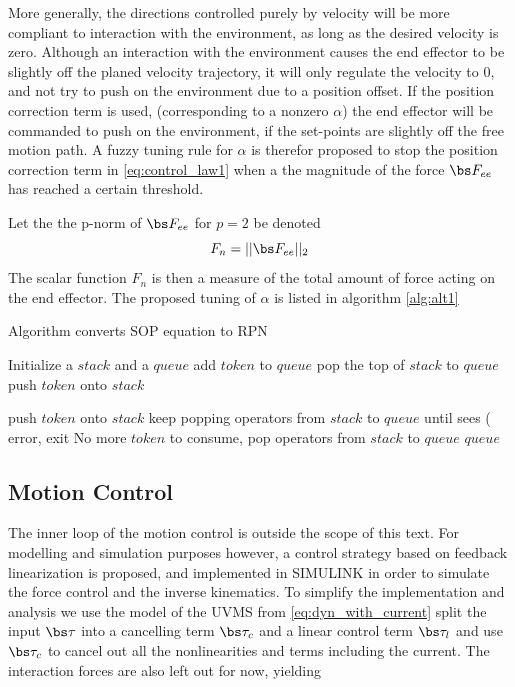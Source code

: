 More generally, the directions controlled purely by velocity will be more compliant to interaction with the environment, as long as the desired velocity is zero. Although an interaction with the environment causes the end effector to be slightly off the planed velocity trajectory, it will only regulate the velocity to 0, and not try to push on the environment due to a position offset. If the position correction term is used, (corresponding to a nonzero $\alpha$)
the end effector will be commanded to push on the environment, if the set-points are slightly off the free motion path. A fuzzy tuning rule for $\alpha$ is therefor proposed to stop the position correction term in \eqref{eq:control_law1} when a the magnitude of the force $\bs F_{ee}$ has reached a certain threshold. 


Let the the p-norm of $\bs F_{ee}$ for $p=2$ be denoted $$F_n=||\bs F_{ee}||_{2}$$ The scalar function $F_{n}$ is then a measure of the total amount of force acting on the end effector. The proposed tuning of $\alpha$ is listed in algorithm \ref{alg:alt1} 

\begin{algorithm}
	\caption{Algorithm converts SOP equation to RPN \label{alg:alt1}}
\begin{algorithmic}[1]
\REQUIRE Initialize a $stack$ and a $queue$
        \STATE add $token$ to $queue$
            \STATE pop the top of $stack$ to $queue$
        \ENDIF
        \STATE push $token$ onto $stack$
 
        \STATE push $token$ onto $stack$
        \STATE keep popping operators from $stack$ to $queue$ until sees (
    \ELSE
        \STATE error, exit
    \ENDIF
\ENDFOR
\STATE No more $token$ to consume, pop operators from $stack$ to $queue$
\RETURN $queue$
\end{algorithmic}
\end{algorithm}
















\subsection{Motion Control}
The inner loop of the motion control is outside the scope of this text. For modelling and simulation purposes however, a control strategy based on feedback linearization is proposed, and implemented in SIMULINK in order to 
simulate the force control and the inverse kinematics. To simplify the implementation and analysis we use the model of the UVMS from \eqref{eq:dyn_with_current} split the input $\bs \tau$ into a cancelling term $\bs \tau_c$ and a 
linear control term $\bs \tau_l$ and use $\bs \tau_c$ to cancel out all the nonlinearities and terms including the current. The interaction forces are also left out for now, yielding

